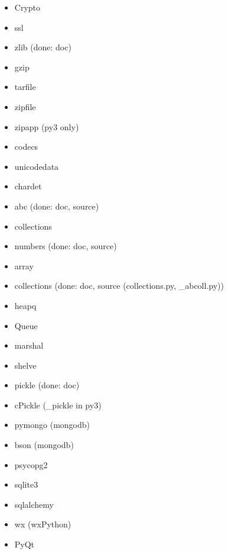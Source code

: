 \documentclass{article}
\begin{document}
\begin{enumerate}
\begin{itemize}
            \item Crypto
            \item ssl

            \item zlib (done: doc)
            \item gzip
            \item tarfile
            \item zipfile
            \item zipapp (py3 only)

            \item codecs
            \item unicodedata
            \item chardet

            \item abc (done: doc, source)
            \item collections
            \item numbers (done: doc, source)

            \item array
            \item collections (done: doc, source (collections.py, _abcoll.py))
            \item heapq
            \item Queue

            \item marshal
            \item shelve
            \item pickle (done: doc)
            \item cPickle (_pickle in py3)
            \item pymongo (mongodb)
            \item bson (mongodb)
            \item psycopg2
            \item sqlite3
            \item sqlalchemy

            \item wx (wxPython)
            \item PyQt


\end{itemize}
\end{enumerate}
\end{document}
